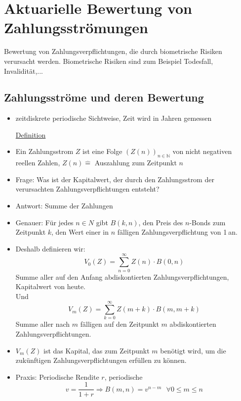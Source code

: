 
\section{Aktuarielle Bewertung von Zahlungsströmungen}
\label{sec:zahlungsströmungen}
 Bewertung von Zahlungsverpflichtungen, die durch biometrische Risiken verursacht werden. Biometrische Risiken sind zum Beispiel Todesfall, Invalidität,...\\
\subsection{Zahlungsströme und deren Bewertung}
\label{sub:zahlungsströme}
\begin{itemize}
	\item zeitdiskrete periodische Sichtweise, Zeit wird in Jahren gemessen
	\item[\uline{Definition}]
	\item Ein Zahlungsstrom $Z$ ist eine Folge $(Z(n))_{n \in \mathds{N}}$ von nicht negativen reellen Zahlen, $Z(n) \mathrel{\hat=}$ Auszahlung zum Zeitpunkt $n$
	\item Frage: Was ist der Kapitalwert, der durch den Zahlungsstrom der verursachten Zahlungsverpflichtungen entsteht?
	\item Antwort: Summe der  Zahlungen
	\item Genauer: Für jedes $n\in N$ gibt $B(k,n)$, den Preis des $n$-Bonds zum Zeitpunkt $k$, den Wert einer in $n$ fälligen Zahlungsverpflichtung von 1\texteuro$~$an.
	\item Deshalb definieren wir:\\
	\[V_0(Z)= \sum_{n=0}^{\infty}Z(n)\cdot B(0,n) \]
	Summe aller auf den Anfang abdiskontierten Zahlungsverpflichtungen, Kapitalwert von heute.\\Und
	\[V_m(Z)= \sum_{k=0}^{\infty}Z(m+k)\cdot B(m,m+k) \]
	Summe aller nach $m$ fälligen auf den Zeitpunkt $m$ abdiskontierten Zahlungsverpflichtungen.
	\item $V_m(Z)$ ist das Kapital, das zum Zeitpunkt $m$ benötigt wird, um die zukünftigen Zahlungsverpflichtungen erfüllen zu können.
	\item Praxis: Periodische Rendite $r$, periodische 
	\[v=\frac{1}{1+r} \Rightarrow B(m,n)=v^{n-m}~~~\forall 0\le m\le n \]
\end{itemize}

